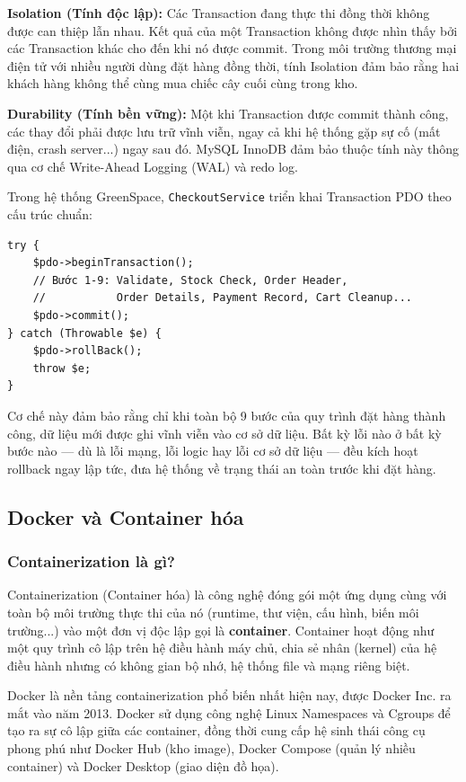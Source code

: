 \documentclass[11pt, a4paper]{article}
\begin{document}
\textbf{Isolation (Tính độc lập):} Các Transaction đang thực thi đồng thời không được can thiệp lẫn nhau. Kết quả của một Transaction không được nhìn thấy bởi các Transaction khác cho đến khi nó được commit. Trong môi trường thương mại điện tử với nhiều người dùng đặt hàng đồng thời, tính Isolation đảm bảo rằng hai khách hàng không thể cùng mua chiếc cây cuối cùng trong kho.

\textbf{Durability (Tính bền vững):} Một khi Transaction được commit thành công, các thay đổi phải được lưu trữ vĩnh viễn, ngay cả khi hệ thống gặp sự cố (mất điện, crash server...) ngay sau đó. MySQL InnoDB đảm bảo thuộc tính này thông qua cơ chế Write-Ahead Logging (WAL) và redo log.

Trong hệ thống GreenSpace, \texttt{CheckoutService} triển khai Transaction PDO theo cấu trúc chuẩn:

\begin{verbatim}
try {
    $pdo->beginTransaction();
    // Bước 1-9: Validate, Stock Check, Order Header,
    //           Order Details, Payment Record, Cart Cleanup...
    $pdo->commit();
} catch (Throwable $e) {
    $pdo->rollBack();
    throw $e;
}
\end{verbatim}

Cơ chế này đảm bảo rằng chỉ khi toàn bộ 9 bước của quy trình đặt hàng thành công, dữ liệu mới được ghi vĩnh viễn vào cơ sở dữ liệu. Bất kỳ lỗi nào ở bất kỳ bước nào --- dù là lỗi mạng, lỗi logic hay lỗi cơ sở dữ liệu --- đều kích hoạt rollback ngay lập tức, đưa hệ thống về trạng thái an toàn trước khi đặt hàng.

\subsection{Docker và Container hóa}

\subsubsection{Containerization là gì?}

Containerization (Container hóa) là công nghệ đóng gói một ứng dụng cùng với toàn bộ môi trường thực thi của nó (runtime, thư viện, cấu hình, biến môi trường...) vào một đơn vị độc lập gọi là \textbf{container}. Container hoạt động như một quy trình cô lập trên hệ điều hành máy chủ, chia sẻ nhân (kernel) của hệ điều hành nhưng có không gian bộ nhớ, hệ thống file và mạng riêng biệt.

Docker là nền tảng containerization phổ biến nhất hiện nay, được Docker Inc. ra mắt vào năm 2013. Docker sử dụng công nghệ Linux Namespaces và Cgroups để tạo ra sự cô lập giữa các container, đồng thời cung cấp hệ sinh thái công cụ phong phú như Docker Hub (kho image), Docker Compose (quản lý nhiều container) và Docker Desktop (giao diện đồ họa).
\end{document}
